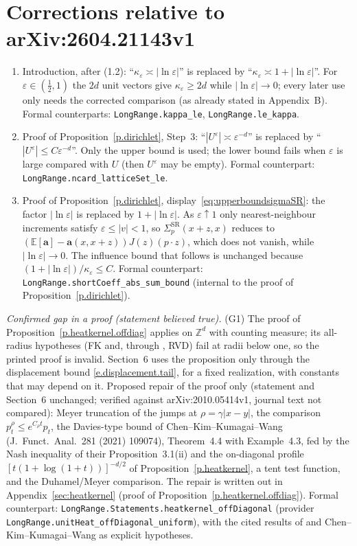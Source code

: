 \documentclass[11pt]{amsart}
\theoremstyle{plain}
\theoremstyle{definition}
\theoremstyle{remark}
\newcommand{\E}{\mathbb{E}}
\newcommand{\Zd}{\mathbb{Z}^d}
\renewcommand{\a}{\mathbf{a}}
\newcommand{\eps}{\varepsilon}
\begin{document}
\section*{Corrections relative to arXiv:2604.21143v1}
\begin{enumerate}
\item[(C1)] Introduction, after (1.2): ``$\kappa_\eps \asymp |\ln\eps|$'' is replaced by
``$\kappa_\eps \asymp 1+|\ln\eps|$''. For $\eps\in(\tfrac12,1)$ the $2d$ unit vectors give
$\kappa_\eps\ge 2d$ while $|\ln\eps|\to0$; every later use only needs the corrected
comparison (as already stated in Appendix~B). Formal counterparts: \texttt{LongRange.kappa\_le},
\texttt{LongRange.le\_kappa}.
\item[(C2)] Proof of Proposition~\ref{p.dirichlet}, Step~3: ``$|U^\eps|\asymp\eps^{-d}$'' is
replaced by ``$|U^\eps|\le C\eps^{-d}$''. Only the upper bound is used; the lower bound fails when
$\eps$ is large compared with $U$ (then $U^\eps$ may be empty). Formal counterpart:
\texttt{LongRange.ncard\_latticeSet\_le}.
\item[(C3)] Proof of Proposition~\ref{p.dirichlet}, display~\eqref{eq:upperboundsigmaSR}: the
factor $|\ln\eps|$ is replaced by $1+|\ln\eps|$. As $\eps\uparrow1$ only nearest-neighbour
increments satisfy $\eps\le|v|<1$, so $\Sigma_p^{\mathrm{SR}}(x+z,x)$ reduces to
$(\E[\a]-\a(x,x+z))J(z)(p\cdot z)$, which does not vanish, while $|\ln\eps|\to0$. The influence
bound that follows is unchanged because $(1+|\ln\eps|)/\kappa_\eps\le C$. Formal counterpart:
\texttt{LongRange.shortCoeff\_abs\_sum\_bound} (internal to the proof of Proposition~\ref{p.dirichlet}).
\end{enumerate}
\noindent\emph{Confirmed gap in a proof (statement believed true).} (G1) The proof of
Proposition~\ref{p.heatkernel.offdiag} applies \cite[Theorem~1.12]{ChenKumagaiWang2019} on
$\Zd$ with counting measure; its all-radius hypotheses (FK and, through
\cite[Proposition~2.1]{ChenKumagaiWang2019}, RVD) fail at radii below one, so the printed proof
is invalid. Section~6 uses the proposition only through the displacement bound
\eqref{e.displacement.tail}, for a fixed realization, with constants that may depend on it.
Proposed repair of the proof only (statement and Section~6 unchanged; verified against
arXiv:2010.05414v1, journal text not compared): Meyer truncation of the jumps at
$\rho=\gamma|x-y|$, the comparison $p^\rho_t\le e^{C_\rho t}p_t$, the Davies-type bound of
Chen--Kim--Kumagai--Wang (J.~Funct.\ Anal.\ 281 (2021) 109074), Theorem~4.4 with Example~4.3,
fed by the Nash inequality of their Proposition~3.1(ii) and the on-diagonal profile
$[t(1+\log(1+t))]^{-d/2}$ of Proposition~\ref{p.heatkernel}, a tent test function, and the
Duhamel/Meyer comparison. The repair is written out in Appendix~\ref{sec:heatkernel} (proof of
Proposition~\ref{p.heatkernel.offdiag}). Formal counterpart: \texttt{LongRange.Statements.heatkernel\_offDiagonal}
(provider \texttt{LongRange.unitHeat\_offDiagonal\_uniform}), with the cited results of
\cite{MuruganSaloffCoste2015} and Chen--Kim--Kumagai--Wang as explicit hypotheses.
\end{document}
